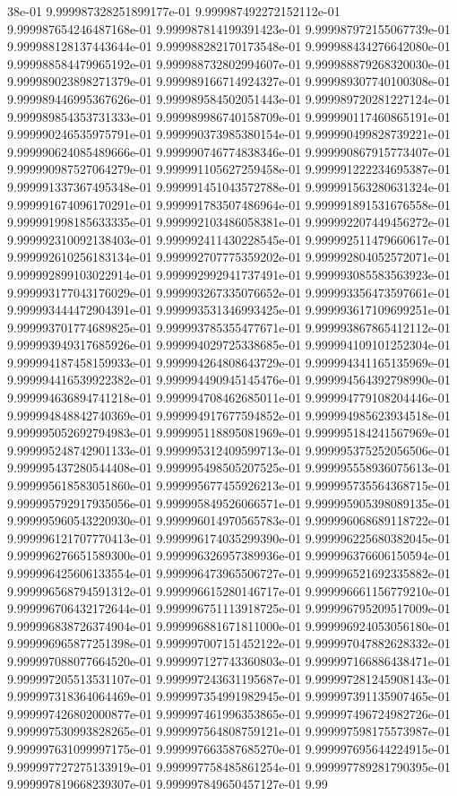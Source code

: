 38e-01	9.999987328251899177e-01	9.999987492272152112e-01	9.999987654246487168e-01	9.999987814199391423e-01	9.999987972155067739e-01	9.999988128137443644e-01	9.999988282170173548e-01	9.999988434276642080e-01	9.999988584479965192e-01	9.999988732802994607e-01	9.999988879268320030e-01	9.999989023898271379e-01	9.999989166714924327e-01	9.999989307740100308e-01	9.999989446995367626e-01	9.999989584502051443e-01	9.999989720281227124e-01	9.999989854353731333e-01	9.999989986740158709e-01	9.999990117460865191e-01	9.999990246535975791e-01	9.999990373985380154e-01	9.999990499828739221e-01	9.999990624085489666e-01	9.999990746774838346e-01	9.999990867915773407e-01	9.999990987527064279e-01	9.999991105627259458e-01	9.999991222234695387e-01	9.999991337367495348e-01	9.999991451043572788e-01	9.999991563280631324e-01	9.999991674096170291e-01	9.999991783507486964e-01	9.999991891531676558e-01	9.999991998185633335e-01	9.999992103486058381e-01	9.999992207449456272e-01	9.999992310092138403e-01	9.999992411430228545e-01	9.999992511479660617e-01	9.999992610256183134e-01	9.999992707775359202e-01	9.999992804052572071e-01	9.999992899103022914e-01	9.999992992941737491e-01	9.999993085583563923e-01	9.999993177043176029e-01	9.999993267335076652e-01	9.999993356473597661e-01	9.999993444472904391e-01	9.999993531346993425e-01	9.999993617109699251e-01	9.999993701774689825e-01	9.999993785355477671e-01	9.999993867865412112e-01	9.999993949317685926e-01	9.999994029725338685e-01	9.999994109101252304e-01	9.999994187458159933e-01	9.999994264808643729e-01	9.999994341165135969e-01	9.999994416539922382e-01	9.999994490945145476e-01	9.999994564392798990e-01	9.999994636894741218e-01	9.999994708462685011e-01	9.999994779108204446e-01	9.999994848842740369e-01	9.999994917677594852e-01	9.999994985623934518e-01	9.999995052692794983e-01	9.999995118895081969e-01	9.999995184241567969e-01	9.999995248742901133e-01	9.999995312409599713e-01	9.999995375252056506e-01	9.999995437280544408e-01	9.999995498505207525e-01	9.999995558936075613e-01	9.999995618583051860e-01	9.999995677455926213e-01	9.999995735564368715e-01	9.999995792917935056e-01	9.999995849526066571e-01	9.999995905398089135e-01	9.999995960543220930e-01	9.999996014970565783e-01	9.999996068689118722e-01	9.999996121707770413e-01	9.999996174035299390e-01	9.999996225680382045e-01	9.999996276651589300e-01	9.999996326957389936e-01	9.999996376606150594e-01	9.999996425606133554e-01	9.999996473965506727e-01	9.999996521692335882e-01	9.999996568794591312e-01	9.999996615280146717e-01	9.999996661156779210e-01	9.999996706432172644e-01	9.999996751113918725e-01	9.999996795209517009e-01	9.999996838726374904e-01	9.999996881671811000e-01	9.999996924053056180e-01	9.999996965877251398e-01	9.999997007151452122e-01	9.999997047882628332e-01	9.999997088077664520e-01	9.999997127743360803e-01	9.999997166886438471e-01	9.999997205513531107e-01	9.999997243631195687e-01	9.999997281245908143e-01	9.999997318364064469e-01	9.999997354991982945e-01	9.999997391135907465e-01	9.999997426802000877e-01	9.999997461996353865e-01	9.999997496724982726e-01	9.999997530993828265e-01	9.999997564808759121e-01	9.999997598175573987e-01	9.999997631099997175e-01	9.999997663587685270e-01	9.999997695644224915e-01	9.999997727275133919e-01	9.999997758485861254e-01	9.999997789281790395e-01	9.999997819668239307e-01	9.999997849650457127e-01	9.99